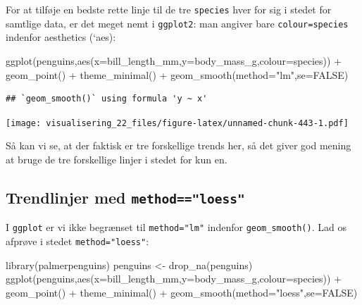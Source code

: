 \documentclass[
]{book}
\newenvironment{Shaded}{\begin{snugshade}}{\end{snugshade}}
\newcommand{\AttributeTok}[1]{\textcolor[rgb]{0.77,0.63,0.00}{#1}}
\newcommand{\ConstantTok}[1]{\textcolor[rgb]{0.00,0.00,0.00}{#1}}
\newcommand{\FunctionTok}[1]{\textcolor[rgb]{0.00,0.00,0.00}{#1}}
\newcommand{\NormalTok}[1]{#1}
\newcommand{\OtherTok}[1]{\textcolor[rgb]{0.56,0.35,0.01}{#1}}
\newcommand{\SpecialCharTok}[1]{\textcolor[rgb]{0.00,0.00,0.00}{#1}}
\newcommand{\StringTok}[1]{\textcolor[rgb]{0.31,0.60,0.02}{#1}}
\begin{document}
For at tilføje en bedste rette linje til de tre \texttt{species} hver for sig i stedet for samtlige data, er det meget nemt i \texttt{ggplot2}: man angiver bare \texttt{colour=species} indenfor aesthetics (`aes):

\begin{Shaded}
\begin{Highlighting}[]
\FunctionTok{ggplot}\NormalTok{(penguins,}\FunctionTok{aes}\NormalTok{(}\AttributeTok{x=}\NormalTok{bill\_length\_mm,}\AttributeTok{y=}\NormalTok{body\_mass\_g,}\AttributeTok{colour=}\NormalTok{species)) }\SpecialCharTok{+} 
  \FunctionTok{geom\_point}\NormalTok{() }\SpecialCharTok{+} 
  \FunctionTok{theme\_minimal}\NormalTok{() }\SpecialCharTok{+} 
  \FunctionTok{geom\_smooth}\NormalTok{(}\AttributeTok{method=}\StringTok{"lm"}\NormalTok{,}\AttributeTok{se=}\ConstantTok{FALSE}\NormalTok{)}
\end{Highlighting}
\end{Shaded}

\begin{verbatim}
## `geom_smooth()` using formula 'y ~ x'
\end{verbatim}

\texttt{[image: visualisering\_22\_files/figure-latex/unnamed-chunk-443-1.pdf]}

Så kan vi se, at der faktisk er tre forskellige trends her, så det giver god mening at bruge de tre forskellige linjer i stedet for kun en.

\hypertarget{trendlinjer-med-methodloess}{%
\subsection{\texorpdfstring{Trendlinjer med \texttt{method=="loess"}}{Trendlinjer med method=="loess"}}\label{trendlinjer-med-methodloess}}

I \texttt{ggplot} er vi ikke begrænset til \texttt{method="lm"} indenfor \texttt{geom\_smooth()}. Lad os afprøve i stedet \texttt{method="loess"}:

\begin{Shaded}
\begin{Highlighting}[]
\FunctionTok{library}\NormalTok{(palmerpenguins)}
\NormalTok{penguins }\OtherTok{\textless{}{-}} \FunctionTok{drop\_na}\NormalTok{(penguins)}
\FunctionTok{ggplot}\NormalTok{(penguins,}\FunctionTok{aes}\NormalTok{(}\AttributeTok{x=}\NormalTok{bill\_length\_mm,}\AttributeTok{y=}\NormalTok{body\_mass\_g,}\AttributeTok{colour=}\NormalTok{species)) }\SpecialCharTok{+} 
  \FunctionTok{geom\_point}\NormalTok{() }\SpecialCharTok{+} 
  \FunctionTok{theme\_minimal}\NormalTok{() }\SpecialCharTok{+} 
  \FunctionTok{geom\_smooth}\NormalTok{(}\AttributeTok{method=}\StringTok{"loess"}\NormalTok{,}\AttributeTok{se=}\ConstantTok{FALSE}\NormalTok{)}
\end{Highlighting}
\end{Shaded}
\end{document}
